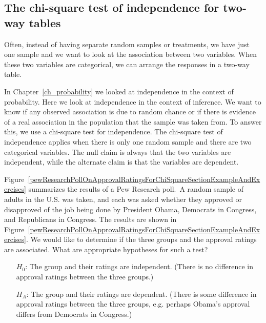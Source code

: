 \subsection{The chi-square test of independence for two-way tables}

Often, instead of having separate random samples or treatments, we have just one sample and we want to look at the association between two variables.  When these two variables are categorical, we can arrange the responses in a two-way table.  

In Chapter~\ref{ch_probability} we looked at independence in the context of probability.  Here we look at independence in the context of inference.  We want to know if any observed association is due to random chance or if there is evidence of a real association in the population that the sample was taken from.  To answer this, we use a chi-square test for independence.  The chi-square test of independence applies when there is only one random sample and there are two categorical variables.  The null claim is always that the two variables are independent, while the alternate claim is that the variables are dependent.


\begin{examplewrap}
\begin{nexample}
{Figure~\ref{pewResearchPollOnApprovalRatingsForChiSquareSectionExampleAndExercises} summarizes the results of a Pew Research poll.\footnotemark\, A random sample of adults in the U.S. was taken, and each was asked whether they approved or disapproved of the job being done by President Obama, Democrats in Congress, and Republicans in Congress.  The results are shown in Figure~\ref{pewResearchPollOnApprovalRatingsForChiSquareSectionExampleAndExercises}.  We would like to determine if the three groups and the approval ratings are associated. What are appropriate hypotheses for such a test?\label{hypothesisTestSetupForPewResearchPollOnApprovalRatingsForChiSquareSection}}
\begin{itemize}
\item[$H_0$:] The group and their ratings are independent. (There is no difference in approval ratings between the three groups.)
\item[$H_A$:] The group and their ratings are dependent. (There is some difference in approval ratings between the three groups, e.g. perhaps Obama's approval differs from Democrats in Congress.)
\end{itemize}
\end{nexample}
\end{examplewrap}

